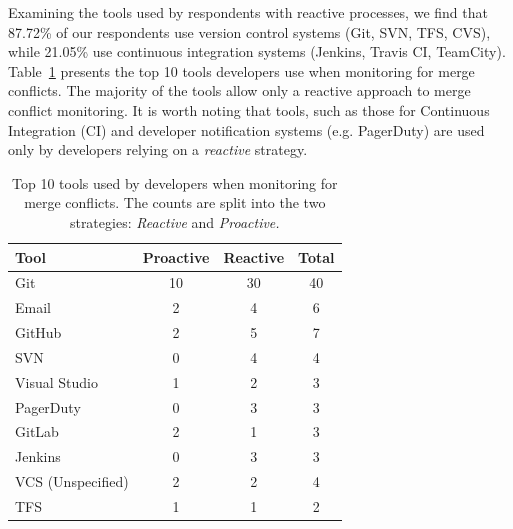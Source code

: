 
Examining the tools used by respondents with reactive processes, we find that 87.72\% of our respondents use version control systems (Git, SVN, TFS, CVS), while 21.05\% use continuous integration systems (Jenkins, Travis CI, TeamCity).
Table~\ref{tab:tool-counts} presents the top 10 tools developers use when monitoring for merge conflicts.
The majority of the tools allow only a reactive approach to merge conflict monitoring.
It is worth noting that tools, such as those for Continuous Integration (CI) and developer notification systems (e.g. PagerDuty) are used only by developers relying on a \emph{reactive} strategy.


\begin{table}[hbt]
\caption{Top 10 tools used by developers when monitoring for merge conflicts. The counts are split into the two strategies: \emph{Reactive} and \emph{Proactive.}}
\label{tab:tool-counts}
\centering
\begin{tabular}{lccc}
\toprule
Tool & Proactive & Reactive & Total \\
\midrule
Git					& 10 & 30 & 40 \\
Email				& 2  & 4  & 6  \\
GitHub				& 2  & 5  & 7  \\
SVN					& 0  & 4  & 4  \\
Visual Studio		& 1  & 2  & 3  \\
PagerDuty 		    & 0  & 3  & 3  \\
GitLab				& 2  & 1  & 3  \\
Jenkins				& 0  & 3  & 3  \\
VCS (Unspecified)	& 2  & 2  & 4  \\
TFS					& 1  & 1  & 2  \\
\bottomrule
\end{tabular}	
\vspace*{-0.3\baselineskip}
\end{table}


